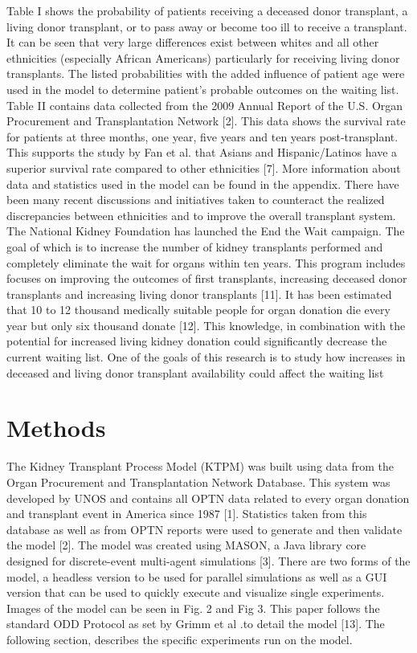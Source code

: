 \documentclass[9pt,a4paper,twocolumn]{scrartcl}
\begin{document}
Table I shows the probability of patients receiving a deceased donor transplant, a living donor transplant, or to pass away or become too ill to receive a transplant.  It can be seen that very large differences exist between whites and all other ethnicities (especially African Americans) particularly for receiving living donor transplants.  The listed probabilities with the added influence of patient age were used in the model to determine patient’s probable outcomes on the waiting list.
Table II contains data collected from the 2009 Annual Report of the U.S. Organ Procurement and Transplantation Network [2].  This data shows the survival rate for patients at three months, one year, five years and ten years post-transplant.  This supports the study by Fan et al. that Asians and Hispanic/Latinos have a superior survival rate compared to other ethnicities [7].  More information about data and statistics used in the model can be found in the appendix.
There have been many recent discussions and initiatives taken to counteract the realized discrepancies between ethnicities and to improve the overall transplant system.  The National Kidney Foundation has launched the End the Wait campaign.  The goal of which is to increase the number of kidney transplants performed and completely eliminate the wait for organs within ten years.  This program includes focuses on improving the outcomes of first transplants, increasing deceased donor transplants and increasing living donor transplants [11]. 
It has been estimated that 10 to 12 thousand medically suitable people for organ donation die every year but only six thousand donate [12].  This knowledge, in combination with the potential for increased living kidney donation could significantly decrease the current waiting list.  One of the goals of this research is to study how increases in deceased and living donor transplant availability could affect the waiting list




\section{Methods}

The Kidney Transplant Process Model (KTPM) was built using data from the Organ Procurement and Transplantation Network Database.  This system was developed by UNOS and contains all OPTN data related to every organ donation and transplant event in America since 1987 [1].  Statistics taken from this database as well as from OPTN reports were used to generate and then validate the model [2].  
The model was created using MASON, a Java library core designed for discrete-event multi-agent simulations [3].  There are two forms of the model, a headless version to be used for parallel simulations as well as a GUI version that can be used to quickly execute and visualize single experiments.  Images of the model can be seen in Fig. 2 and Fig 3.
This paper follows the standard ODD Protocol as set by Grimm et al .to detail the model [13].  The following section, describes the specific experiments run on the model.  
\end{document}
